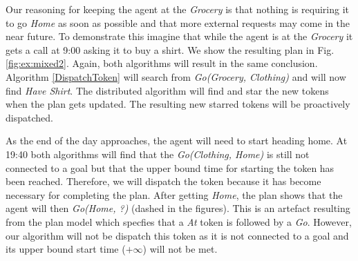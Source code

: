 Our reasoning for keeping the agent at the {\em Grocery} is that
nothing is requiring it to go {\em Home} as soon as possible and that
more external requests may come in the near future. To demonstrate
this imagine that while the agent is at the {\em Grocery} it gets a
call at 9:00 asking it to buy a shirt.  We show the resulting plan in
Fig. \ref{fig:ex:mixed2}. Again, both algorithms will result in the
same conclusion. Algorithm \ref{DispatchToken} will search from {\em
Go(Grocery, Clothing)} and will now find {\em Have Shirt}. The
distributed algorithm will find and star the new tokens when the plan
gets updated. The resulting new starred tokens will be proactively
dispatched.

As the end of the day approaches, the agent will need to start heading
home. At 19:40 both algorithms will find that the {\em Go(Clothing,
Home)} is still not connected to a goal but that the upper bound time
for starting the token has been reached. Therefore, we will dispatch
the token because it has become necessary for completing the plan.
After getting {\em Home}, the plan shows that the agent will then {\em
Go(Home, ?)} (dashed in the figures). This is an artefact resulting
from the plan model which specfies that a {\em At} token is followed by a {\em Go}. 
However, our algorithm will not be dispatch this token as 
it is not connected to a goal and its upper bound start time
($+\infty$) will not be met.




